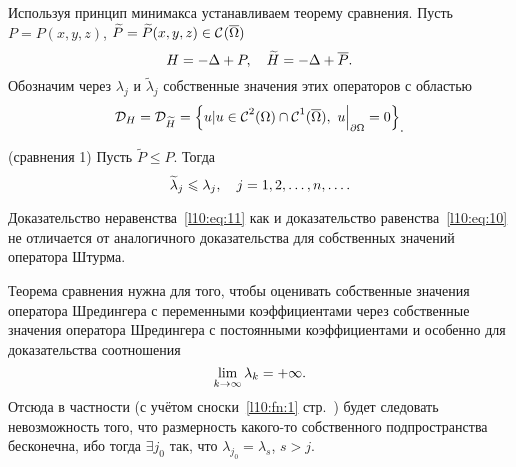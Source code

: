 Используя принцип минимакса устанавливаем теорему сравнения. Пусть $P=P(x,y,z)$, $\widetilde{P}\?=\widetilde{P}(x,y,z)\in\Cfn{}(\overline{\Omega})$
\begin{equation*}
	\hfill H=-\Delta+P,\quad \widetilde{H}=-\Delta+\overline{P}.\hfill
\end{equation*}
Обозначим через $\lambda_j$ и $\widetilde{\lambda}_j$ собственные значения этих операторов с областью 
\begin{equation*}
	\hfill\mc{D}_{H}=\mc{D}_{\widetilde{H}}=\left\{u|u\in\Cfn{2}(\Omega)\cap\Cfn{1}(\overline{\Omega}),\ u\Big|_{\partial \Omega}=0\right\}_{\displaystyle.}\hfill
\end{equation*}
\begin{_teor}(сравнения 1)\label{l10:teor:sr1}
	Пусть $\widetilde{P}\leqslant P$. Тогда 
	\begin{equation}\label{l10:eq:11}
		\hfill\widetilde{\lambda}_j\leqslant\lambda_j,\quad j=1,2,\ldots,n,\ldots.\hfill
	\end{equation}
\end{_teor}
Доказательство неравенства~\eqref{l10:eq:11} как и доказательство равенства~\eqref{l10:eq:10} не отличается от аналогичного доказательства для собственных значений оператора Штурма.

Теорема сравнения нужна для того, чтобы оценивать собственные значения оператора Шредингера с переменными коэффициентами через собственные значения оператора Шредингера с постоянными коэффициентами и особенно для доказательства соотношения
\begin{equation*}
	\hfill\lim\limits_{k\to\infty}\lambda_k=+\infty.\hfill
\end{equation*}
Отсюда в частности (с учётом сноски~\ref{l10:fn:1} стр.~\pageref{l10:fn:1}) будет следовать невозможность того, что размерность какого-то собственного подпространства бесконечна, ибо тогда $\exists j_0$ так, что $\lambda_{j_0}=\lambda_s$, $s>j$.

